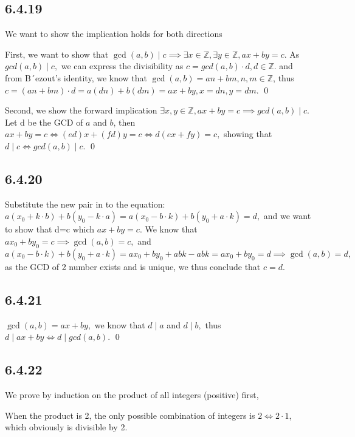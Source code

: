 \documentclass{article}
\begin{document}
\subsection*{6.4.19}

We want to show the implication holds for both directions

First, we want to show that $\gcd(a,b)\mid c\implies \exists x\in\mathbb{Z},\exists y\in\mathbb{Z},ax+by=c.$ As $gcd(a,b)\mid c,$ we can express the divisibility as $c=gcd(a,b)\cdot d,d\in\mathbb{Z}.$ and from B´ezout’s identity, we know that $\gcd(a,b)=an+bm,n,m\in\mathbb{Z}$, thus $c=(an+bm)\cdot d=a(dn)+b(dm)=ax+by,x=dn,y=dm.$ \qed 

Second, we show the forward implication $\exists x,y\in\mathbb{Z}, ax+by=c\implies gcd(a,b)\mid c.$ Let d be the GCD of $a$ and $b$, then $ax+by=c \iff (ed)x+(fd)y=c \iff d(ex+fy)=c,$ showing that $d\mid c \iff gcd(a,b)\mid c$. \qed

\subsection*{6.4.20}

Substitute the new pair in to the equation: $a(x_0+k\cdot b)+b(y_0 - k\cdot a)=a(x_0-b\cdot k)+b(y_0 + a\cdot k)=d,$ and we want to show that d=c which $ax+by=c.$ We know that $ax_0+by_0=c\implies \gcd(a,b)=c,$ and $a(x_0-b\cdot k)+b(y_0 + a\cdot k)=ax_0+by_0+abk-abk=ax_0+by_0=d \implies \gcd(a,b)=d,$ as the GCD of 2 number exists and is unique, we thus conclude that $c=d.$  

\subsection*{6.4.21}

$\gcd(a,b)=ax+by,$ we know that $d\mid a$ and $d\mid b,$ thus $d\mid ax+by\iff d\mid gcd(a,b).$ \qed

\subsection*{6.4.22}

We prove by induction on the product of all integers (positive) first,

When the product is 2, the only possible combination of integers is $2\iff 2\cdot 1$, which obviously is divisible by 2.
\end{document}
